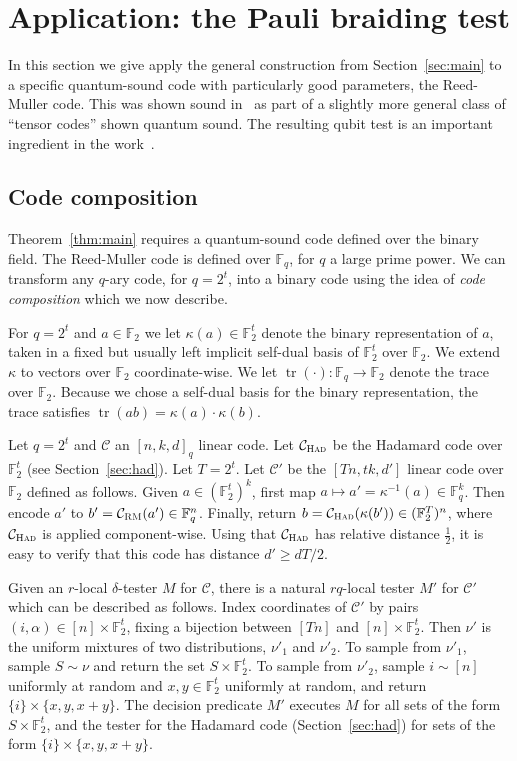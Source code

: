 \documentclass[11pt]{article}
\theoremstyle{definition}
\newcommand{\code}{\mathcal{C}}
\newcommand{\field}{\mathbb{F}_2}
\newcommand{\F}{\ensuremath{\mathbb{F}}}
\newcommand{\mC}{\ensuremath{\mathcal{C}}}
\newcommand{\RM}{\ensuremath{\textsc{RM}}}
\newcommand{\Had}{\ensuremath{\textsc{Had}}}
\DeclareMathOperator{\tr}{tr}
\begin{document}
\section{Application: the Pauli braiding test}
\label{sec:pbt}

In this section we give apply the general construction from Section~\ref{sec:main} to a specific quantum-sound code with particularly good parameters, the Reed-Muller code. This was shown sound in~\cite{ji2022quantum} as part of a slightly more general class of ``tensor codes'' shown quantum sound. The resulting qubit test is an important ingredient in the work~\cite{ji2020mip}.


\subsection{Code composition}
\label{sec:code-comp}

Theorem~\ref{thm:main} requires a quantum-sound code defined over the binary field.  The Reed-Muller code is defined over $\F_q$, for $q$ a large prime power. We can transform any $q$-ary code, for $q=2^t$, into a binary code using the idea of \emph{code composition} which we now describe. 

For $q=2^t$ and $a\in \field$ we let $\kappa(a)\in\F_2^t$ denote the binary representation of $a$, taken in a fixed but usually left implicit self-dual basis of $\F_2^t$ over $\F_2$. We extend $\kappa$ to vectors over $\field$ coordinate-wise. We let $\tr(\cdot):\F_q\to\F_2$ denote the trace over $\F_2$. Because we chose a self-dual basis for the binary representation, the trace satisfies $\tr(ab)=\kappa(a)\cdot\kappa(b)$. 

Let $q=2^t$ and $\code$ an $[n,k,d]_q$ linear code. Let $\code_{\Had}$ be the Hadamard code over $\F_2^t$ (see Section~\ref{sec:had}). Let $T=2^t$.
Let $\mC'$ be the $[Tn,tk,d']$ linear code over $\F_2$ defined as follows. Given $a\in (\F_2^t)^{k}$, first map $a\mapsto a'=\kappa^{-1}(a) \in \F_q^{k}$. Then encode $a'$ to $b'=\code_\RM(a')\in \F_q^n$. Finally, return $b=\code_\Had(\kappa(b'))\in(\F_2^T)^n$, where $\code_\Had$ is applied component-wise. Using that $\code_\Had$ has relative distance $\frac{1}{2}$, it is easy to verify that this code has distance $d'\geq dT/2$.

Given an $r$-local $\delta$-tester $M$ for $\code$, there is a natural $rq$-local tester $M'$ for $\code'$ which can be described as follows. Index coordinates of $\code'$ by pairs $(i,\alpha)\in [n]\times\F_2^t$, fixing a bijection between $[Tn]$ and $[n]\times \F_2^t$. Then $\nu'$ is the uniform mixtures of two distributions, $\nu'_1$ and $\nu'_2$. To sample from $\nu'_1$, sample $S\sim\nu$ and return the set $S\times\F_2^t$. To sample from $\nu'_2$, sample $i\sim[n]$ uniformly at random and $x,y\in\F_2^t$ uniformly at random, and return $\{i\}\times\{x,y,x+y\}$. The decision predicate $M'$ executes $M$ for all sets of the form $S\times \F_2^t$, and the tester for the Hadamard code (Section~\ref{sec:had}) for sets of the form $\{i\}\times\{x,y,x+y\}$.
\end{document}
